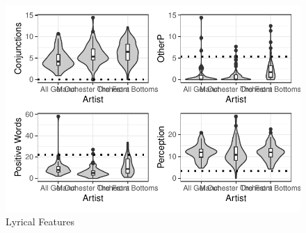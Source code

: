 \documentclass{article}\usepackage[]{graphicx}\usepackage[]{xcolor}
\makeatletter
\def\maxwidth{ %
  \ifdim\Gin@nat@width>\linewidth
    \linewidth
  \else
    \Gin@nat@width
  \fi
}
\newenvironment{knitrout}{}{} %
\makeatother
\begin{document}
\begin{figure}[H]
\begin{center}
\begin{knitrout}
\color{fgcolor}
\includegraphics[width=\maxwidth]{figure/unnamed-chunk-5-1} 
\end{knitrout}
\caption{Lyrical Features}
\label{lyrical} 
\end{center}
\end{figure}
\end{document}
